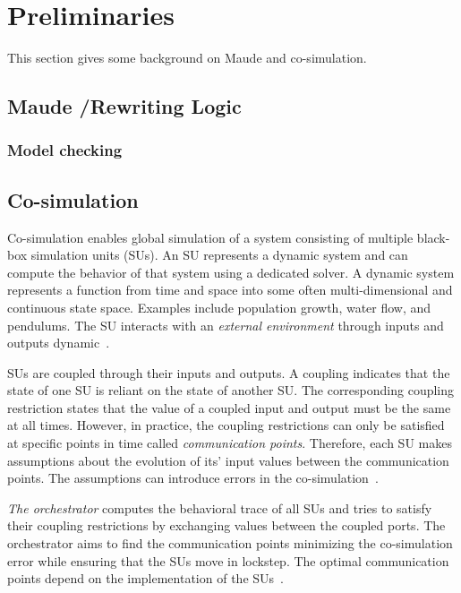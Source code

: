 \section{Preliminaries}\label{sc:background}
This section gives some background on Maude and co-simulation.

\subsection{Maude /Rewriting Logic}

\subsubsection{Model checking}


\subsection{Co-simulation}
Co-simulation enables global simulation of a system consisting of multiple black-box simulation units (SUs). 
An SU represents a dynamic system and can compute the behavior of that system using a dedicated solver. 
A dynamic system represents a function from time and space into some often multi-dimensional and continuous state space. 
Examples include population growth, water flow, and pendulums. 
The SU interacts with an \emph{external environment} through inputs and outputs dynamic~\cite{Gomes2019a,Kubler2000}.

SUs are coupled through their inputs and outputs.
A coupling indicates that the state of one SU is reliant on the state of another SU.
The corresponding coupling restriction states that the value of a coupled input and output must be the same at all times.
However, in practice, the coupling restrictions can only be satisfied at specific points in time called \emph{communication points}. 
Therefore, each SU makes assumptions about the evolution of its' input values between the communication points.
The assumptions can introduce errors in the co-simulation~\cite{Arnold2014}.

\emph{The orchestrator} computes the behavioral trace of all SUs and tries to satisfy their coupling restrictions by exchanging values between the coupled ports. 
The orchestrator aims to find the communication points minimizing the co-simulation error while ensuring that the SUs move in lockstep. 
The optimal communication points depend on the implementation of the SUs~\cite{Gomes2019,Oakes2021,Gomes2018f,Schweizer2015c,Gomes2018a}.

